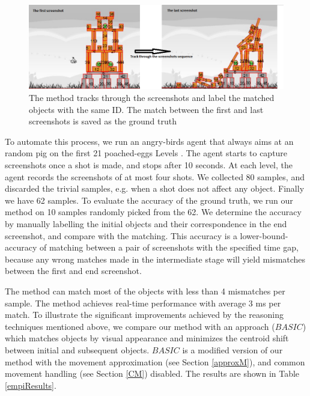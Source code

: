 \documentclass[letterpaper]{article}
\begin{document}
\begin{figure}[h!]
\centering\includegraphics[scale=0.32]{TrackingBackup.png}\caption{The method tracks through the screenshots and label the matched objects with the same ID. The match between the first and last screenshots is saved as the ground truth }
\label{Tracking}
\end{figure}

To automate this process, we run an angry-birds agent that always aims at an random pig on the first 21 poached-eggs Levels \cite{abGame}. The agent starts to capture screenshots once a shot is made, and stops after 10 seconds. At each level, the agent records the screenshots of at most four shots.
We collected 80 samples, and discarded the trivial samples, e.g. when a shot does not affect any object. Finally we have 62 samples. To evaluate the accuracy of the ground truth, we run our method on 10 samples randomly picked from the 62. We determine the accuracy by manually labelling the initial objects and their correspondence in the end screenshot, and compare with the matching. This accuracy is a lower-bound-accuracy of matching between a pair of screenshots with the specified time gap, because any wrong matches made in the intermediate stage will yield mismatches between the first and end screenshot.  

The method can match most of the objects with less than 4 mismatches per sample. The method achieves real-time performance with average 3 ms per match. To illustrate the significant improvements achieved by the reasoning techniques mentioned above, we compare our method with an approach ($BASIC$) which matches objects by visual appearance and minimizes the centroid shift between initial and subsequent objects. $BASIC$ is a modified version of our method with the movement approximation (see Section \ref{approxM}), and common movement handling (see Section \ref{CM}) disabled. The results are shown in Table \ref{empiResults}.
\end{document}

